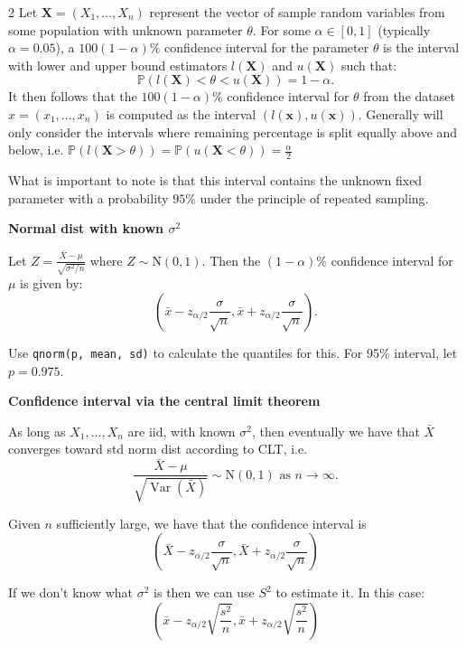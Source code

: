 \documentclass[10pt]{extarticle}
\theoremstyle{definition}
\theoremstyle{remark}
\newcommand{\pf}{\mathbb{P}}
\DeclareMathOperator{\Var}{Var}
\begin{document}
\begin{multicols}{2}
    Let $\mathbf{X} = (X_1 , \ldots, X_n)$ represent the vector of sample random
    variables from some population with unknown parameter $\theta$. For some
    $\alpha \in [0, 1]$ (typically $\alpha = 0.05$), a $100(1 - \alpha)\%$
    confidence interval for the
    parameter $\theta$ is the interval with lower and upper bound estimators 
    $l(\mathbf{X})$ and $u(\mathbf{X})$ such that: \[
        \pf(l (\mathbf{X}) < \theta < u(\mathbf{X})) = 1 - \alpha. 
    \] It then follows that
    the $100(1 - \alpha)\%$ confidence interval for $\theta$ from the dataset 
    $x = (x_1 , \ldots , x_n )$ is computed as the interval $(l (\mathbf{x}),
    u(\mathbf{x}))$. 
    Generally will only consider the intervals where remaining percentage is split 
    equally above and below, i.e. 
    $\pf(l(\mathbf{X} > \theta)) = \pf(u(\mathbf{X} < \theta)) = \frac{\alpha}{2}$

    What is important to note is that this interval contains the unknown fixed parameter
    with a probability $95\%$ under the principle of repeated sampling. 

    \noindent
    \textbf{Normal dist with known $\sigma^2$}

    Let $Z = \frac{\bar{X} - \mu}{\sqrt{\sigma^2/n}}$ where $Z \sim \text{N}(0,1)$. 
    Then the $(1 - \alpha)\%$ confidence interval for $\mu$ is given by: 
    \[
        \left( \bar{x} - z_{\alpha/2} \frac{\sigma}{\sqrt{n}}, \bar{x} + z_{\alpha/2} \frac{\sigma}{\sqrt{n}} \right).
    \]

    Use \verb|qnorm(p, mean, sd)| to calculate the quantiles for this. 
    For 95\% interval, let $p = 0.975$.

    \noindent
    \textbf{Confidence interval via the central limit theorem}

    As long as $X_1, \ldots, X_n$ are iid, with known $\sigma^2$, then eventually 
    we have that $\bar{X}$ converges toward std norm dist according to CLT, i.e.
    \[
        \frac{\bar{X} - \mu}{\sqrt{\Var(\bar{X})}} \sim \text{N}(0,1) \text{ as } n \to \infty.
    \]

    Given $n$ sufficiently large, we have that the confidence interval is \[
        \left( \bar{X} - z_{\alpha / 2} \frac{\sigma}{\sqrt{n}},\bar{X} + z_{\alpha / 2} \frac{\sigma}{\sqrt{n}} \right)
    \]

    If we don't know what $\sigma^2$ is then we can use $S^2$ to estimate it. In this case: 
    \[
        \left( \bar{x} - z_{\alpha / 2} \sqrt{\frac{s^2}{n}},\bar{x} + z_{\alpha / 2} \sqrt{\frac{s^2}{n}} \right)
    \]


\end{multicols}
\end{document}

